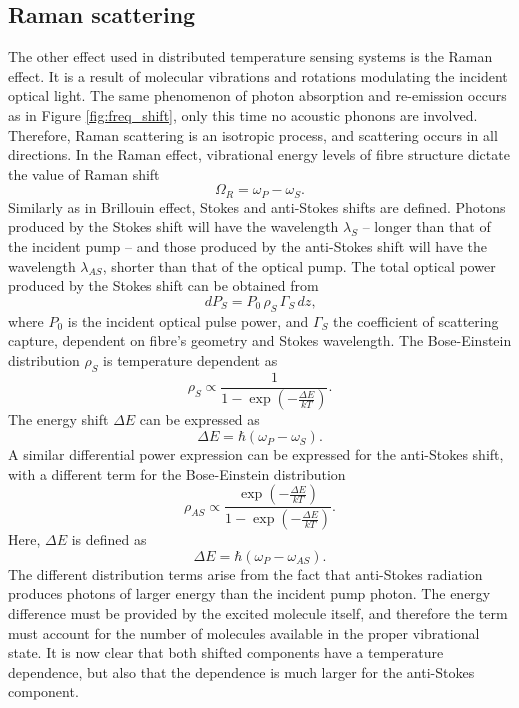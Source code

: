 \documentclass{standalone}
\begin{document}
\subsection{Raman scattering}
The other effect used in distributed temperature sensing systems is the Raman effect. It is a result of molecular vibrations and rotations modulating the incident optical light. The same phenomenon of photon absorption and re-emission occurs as in Figure \ref{fig:freq_shift}, only this time no acoustic phonons are involved. Therefore, Raman scattering is an isotropic process, and scattering occurs in all directions. In the Raman effect, vibrational energy levels of fibre structure dictate the value of Raman shift
\begin{equation}
\Omega_R = \omega_P - \omega_S \textrm{.}
\end{equation}
Similarly as in Brillouin effect, Stokes and anti-Stokes shifts are defined. Photons produced by the Stokes shift will have the wavelength $\lambda_S$ -- longer than that of the incident pump -- and those produced by the anti-Stokes shift will have the wavelength $\lambda_{AS}$, shorter than that of the optical pump. The total optical power produced by the Stokes shift can be obtained from 
\begin{equation} \label{eq:raman_beer}
dP_S = P_0 \, \rho_S \, \Gamma_S \, dz \textrm{,}
\end{equation}
where $P_0$ is the incident optical pulse power, and $\Gamma_S$ the coefficient of scattering capture, dependent on fibre's geometry and Stokes wavelength. The Bose-Einstein distribution $\rho_S$ is temperature dependent as
\begin{equation} \label{eq:be-s}
\rho_S \propto \frac{1}{1- \exp\left( - \frac{\varDelta E}{k T} \right)} \textrm{.}
\end{equation}
The energy shift $\varDelta E$ can be expressed as
\begin{equation}
\varDelta E = \hbar \left( \omega_P - \omega_S \right) \textrm{.}
\end{equation}
A similar differential power expression can be expressed for the anti-Stokes shift, with a different term for the Bose-Einstein distribution
\begin{equation} \label{eq:be-as}
\rho_{AS} \propto \frac{\exp\left( - \frac{\varDelta E}{k T} \right)}{1 - \exp\left( - \frac{\varDelta E}{k T} \right)} \textrm{.}
\end{equation}
Here, $\varDelta E$ is defined as
\begin{equation}
\varDelta E = \hbar \left( \omega_P - \omega_{AS} \right) \textrm{.}
\end{equation}
The different distribution terms arise from the fact that anti-Stokes radiation produces photons of larger energy than the incident pump photon. The energy difference must be provided by the excited molecule itself, and therefore the term must account for the number of molecules available in the proper vibrational state. It is now clear that both shifted components have a temperature dependence, but also that the dependence is much larger for the anti-Stokes component. \\
\end{document}

